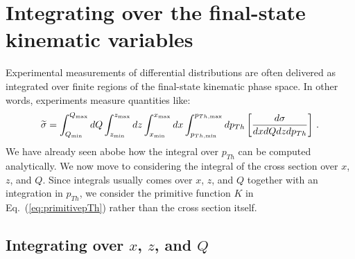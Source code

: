 \documentclass[10pt,a4paper]{article}
\begin{document}
\section{Integrating over the final-state kinematic variables}

Experimental measurements of differential distributions are often
delivered as integrated over finite regions of the final-state
kinematic phase space. In other words, experiments measure quantities
like:
\begin{equation}\label{eq:IntcrosssectionSIDIS}
\widetilde{\sigma}=\int_{Q_{\rm min}}^{Q_{\rm max}}dQ \int_{z_{\rm
    min}}^{z_{\rm max}}dz \int_{x_{\rm min}}^{x_{\rm max}}dx
\int_{p_{Th,\rm min}}^{p_{Th,\rm max}}dp_{Th}\left[\frac{d\sigma}{dxdQ
    dz dp_{Th}} \right]\,.
\end{equation}
We have already seen abobe how the integral over $p_{Th}$ can be
computed analytically. We now move to considering the integral of the
cross section over $x$, $z$, and $Q$. Since integrals usually comes
over $x$, $z$, and $Q$ together with an integration in $p_{Th}$, we
consider the primitive function $K$ in Eq.~(\ref{eq:primitivepTh})
rather than the cross section itself.

\subsection{Integrating over $x$, $z$, and $Q$}
\end{document}
